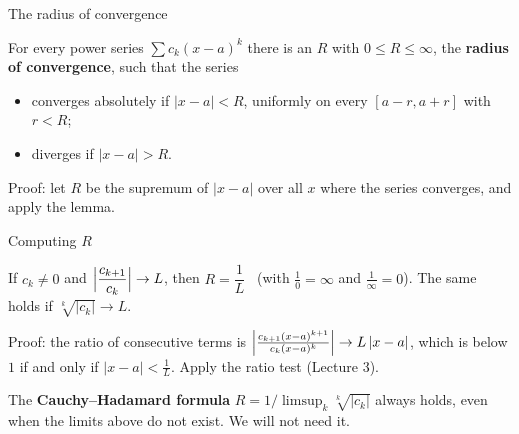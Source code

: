 \documentclass{wosm-slides}
\begin{document}
\begin{frame}{The radius of convergence}
  \begin{theorem}
    For every power series $\sum c_k (x - a)^k$ there is an $R$ with $0 \le R \le \infty$,
    the \textbf{radius of convergence}, such that the series
    \begin{itemize}
      \item converges absolutely if $|x - a| < R$, uniformly on every $[a - r, a + r]$ with $r < R$;
      \item diverges if $|x - a| > R$.
    \end{itemize}
  \end{theorem}
  {\small Proof: let $R$ be the supremum of $|x - a|$ over all $x$ where the series converges,
  and apply the lemma.\par}
  \pause
  {\centering
  \par}
\end{frame}

\begin{frame}{Computing $R$}
  \begin{theorem}
    If $c_k \ne 0$ and $\Bigl|\dfrac{c_{k+1}}{c_k}\Bigr| \to L$, then $R = \dfrac1L$
    \ (with $\frac10 = \infty$ and $\frac1\infty = 0$).
    The same holds if $\sqrt[k]{|c_k|} \to L$.
  \end{theorem}
  {\small Proof: the ratio of consecutive terms is
  $\Bigl|\frac{c_{k+1}(x-a)^{k+1}}{c_k (x-a)^k}\Bigr| \to L\,|x - a|$, which is below $1$ if and
  only if $|x - a| < \frac1L$. Apply the ratio test (Lecture 3).\par}
  \pause
  \begin{remark}
    The \textbf{Cauchy--Hadamard formula} $R = 1 / \limsup_k \sqrt[k]{|c_k|}$ always holds,
    even when the limits above do not exist. We will not need it.
  \end{remark}
\end{frame}
\end{document}
